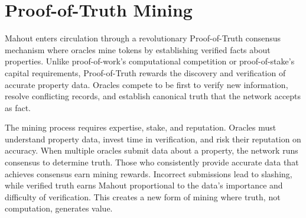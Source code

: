\section{Proof-of-Truth Mining}

Mahout enters circulation through a revolutionary Proof-of-Truth consensus mechanism where oracles mine tokens by establishing verified facts about properties. Unlike proof-of-work's computational competition or proof-of-stake's capital requirements, Proof-of-Truth rewards the discovery and verification of accurate property data. Oracles compete to be first to verify new information, resolve conflicting records, and establish canonical truth that the network accepts as fact.

The mining process requires expertise, stake, and reputation. Oracles must understand property data, invest time in verification, and risk their reputation on accuracy. When multiple oracles submit data about a property, the network runs consensus to determine truth. Those who consistently provide accurate data that achieves consensus earn mining rewards. Incorrect submissions lead to slashing, while verified truth earns Mahout proportional to the data's importance and difficulty of verification. This creates a new form of mining where truth, not computation, generates value.

